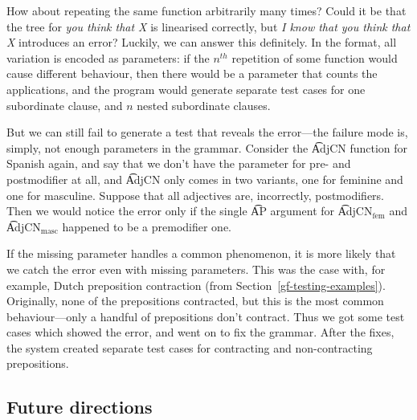 How about repeating the same function arbitrarily many times? Could it
be that the tree for {\em you think that X} is linearised correctly,
but {\em I know that you think that X} introduces an error?  Luckily,
we can answer this definitely.  In the \pmcfg{} format, all variation
is encoded as parameters: if the $n^{th}$ repetition of some function
would cause different behaviour, then there would be a parameter that
counts the applications, and the program would generate separate test
cases for one subordinate clause, and $n$ nested subordinate clauses.

But we can still fail to generate a test that reveals the error---the
failure mode is, simply, not enough parameters in the grammar. Consider the
\t{AdjCN} function for Spanish again, and say that we don’t have the
parameter for pre- and postmodifier at all, and \t{AdjCN} only comes
in two variants, one for feminine and one for masculine. Suppose that
all adjectives are, incorrectly, postmodifiers. Then we would notice
the error only if the single \t{AP} argument for \t{AdjCN$_{\text{fem}}$}
and \t{AdjCN$_{\text{masc}}$} happened to be a premodifier one.

If the missing parameter handles a common phenomenon, it is more
likely that we catch the error even with missing parameters. This was
the case with, for example, Dutch preposition contraction (from
Section~\ref{gf-testing-examples}). Originally, none of the
prepositions contracted, but this is the most common behaviour---only a
handful of prepositions don’t contract. Thus we got some test cases
which showed the error, and went on to fix the grammar. After the
fixes, the system created separate test cases for contracting and
non-contracting prepositions.

\subsection{Future directions}

